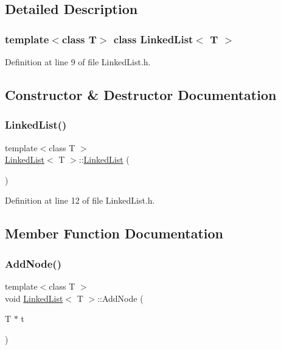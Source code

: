 \subsection{Detailed Description}
\subsubsection*{template$<$class T$>$\newline
class Linked\+List$<$ T $>$}



Definition at line 9 of file Linked\+List.\+h.



\subsection{Constructor \& Destructor Documentation}
\mbox{\label{class_linked_list_a3c20fcfec867e867f541061a09fc640c}} 
\subsubsection{\texorpdfstring{Linked\+List()}{LinkedList()}}
{\footnotesize\ttfamily template$<$class T $>$ \\
\hyperlink{class_linked_list}{Linked\+List}$<$ T $>$\+::\hyperlink{class_linked_list}{Linked\+List} (\begin{DoxyParamCaption}{ }\end{DoxyParamCaption})\hspace{0.3cm}{\ttfamily [inline]}}



Definition at line 12 of file Linked\+List.\+h.



\subsection{Member Function Documentation}
\mbox{\label{class_linked_list_aa0846665f0375a005b79631142eec7fb}} 
\subsubsection{\texorpdfstring{Add\+Node()}{AddNode()}}
{\footnotesize\ttfamily template$<$class T $>$ \\
void \hyperlink{class_linked_list}{Linked\+List}$<$ T $>$\+::Add\+Node (\begin{DoxyParamCaption}\item[{T $\ast$}]{t }\end{DoxyParamCaption})\hspace{0.3cm}{\ttfamily [inline]}}



